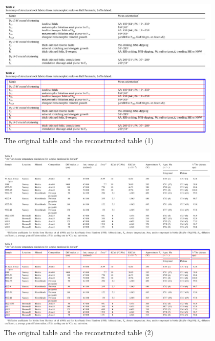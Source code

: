 \documentclass[12pt, a4paper]{article}
\theoremstyle{definition}
\begin{document}
\begin{figure}[htbp]
	\centering
		\begin{minipage}[t]{0.9\linewidth}
		\centering
		\includegraphics[width=\linewidth]{1.png}
		\end{minipage}
		\linebreak 
		\begin{minipage}[t]{0.9\linewidth}
		\centering
		\includegraphics[width=\linewidth]{reconstructed_1.png}
		\end{minipage}
	\caption{The original table and the reconstructed table (1)}
	\label{fig1}
\end{figure}
\begin{figure}[htbp]
	\centering
		\begin{minipage}[t]{0.9\linewidth}
		\centering
		\includegraphics[width=\linewidth]{2.png}
		\end{minipage}
		\linebreak 
		\begin{minipage}[t]{0.9\linewidth}
		\centering
		\includegraphics[width=\linewidth]{reconstructed_2.png}
		\end{minipage}
	\caption{The original table and the reconstructed table (2)}
	\label{fig2}
\end{figure}
\end{document}
